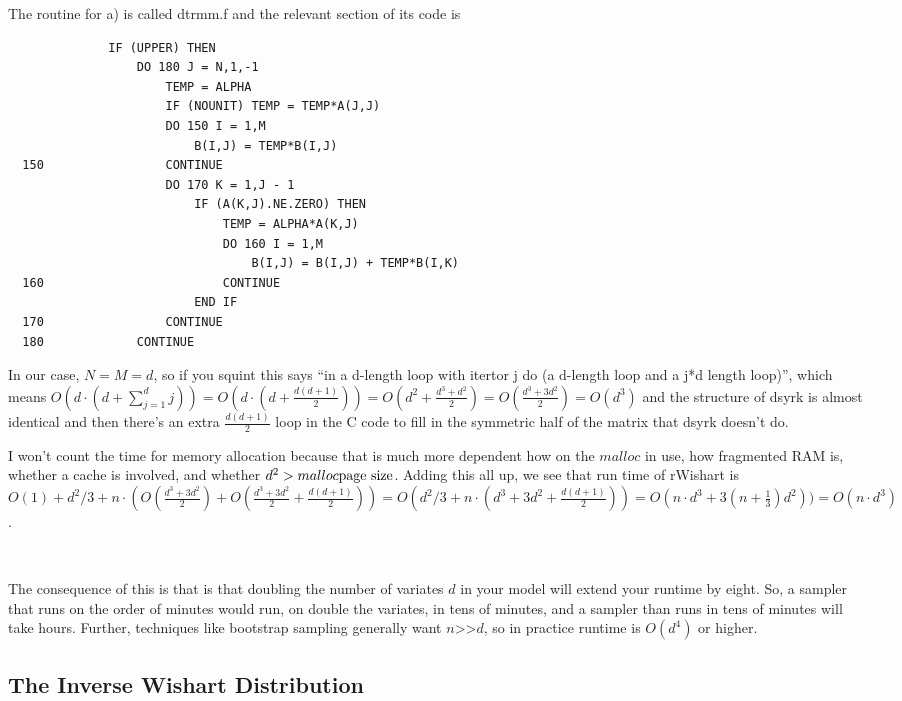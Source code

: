 \documentclass[english]{article}
\begin{document}
The routine for a) is called dtrmm.f and the relevant section of its
code is

\begin{lstlisting}
              IF (UPPER) THEN
                  DO 180 J = N,1,-1
                      TEMP = ALPHA
                      IF (NOUNIT) TEMP = TEMP*A(J,J)
                      DO 150 I = 1,M
                          B(I,J) = TEMP*B(I,J)
  150                 CONTINUE
                      DO 170 K = 1,J - 1
                          IF (A(K,J).NE.ZERO) THEN
                              TEMP = ALPHA*A(K,J)
                              DO 160 I = 1,M
                                  B(I,J) = B(I,J) + TEMP*B(I,K)
  160                         CONTINUE
                          END IF
  170                 CONTINUE
  180             CONTINUE
\end{lstlisting}


In our case, $N=M=d$, so if you squint this says ``in a d-length
loop with itertor j do (a d-length loop and a j{*}d length loop)'',
which means $O(d\cdot(d+\sum_{j=1}^{d}j))=O(d\cdot(d+\frac{d(d+1)}{2}))=O(d^{2}+\frac{d^{3}+d^{2}}{2})=O(\frac{d^{3}+3d^{2}}{2})=O(d^{3})$
and the structure of dsyrk is almost identical  and then there's
an extra $\frac{d(d+1)}{2}$ loop in the C code to fill in the symmetric
half of the matrix that dsyrk doesn't do.

I won't count the time for memory allocation because that is much
more dependent how on the $malloc$ in use, how fragmented RAM is,
whether a cache is involved, and whether $d^{2}>\text{\ensuremath{malloc}page size}$.
Adding this all up, we see that run time of rWishart is $O(1)+d^{2}/3+n\cdot(O(\frac{d^{3}+3d^{2}}{2})+O(\frac{d^{3}+3d^{2}}{2}+\frac{d(d+1)}{2}))=O(d^{2}/3+n\cdot(d^{3}+3d^{2}+\frac{d(d+1)}{2}))=O(n\cdot d^{3}+3(n+\frac{1}{3})d^{2}))=O(n\cdot d^{3})$.

~

The consequence of this is that is that doubling the number of variates
$d$ in your model will extend your runtime by eight. So, a sampler
that runs on the order of minutes would run, on double the variates,
in tens of minutes, and a sampler than runs in tens of minutes will
take hours. Further, techniques like bootstrap sampling generally
want $n$>\textcompwordmark{}>$d$, so in practice runtime is $O(d^{4})$
or higher. 




\subsection*{The Inverse Wishart Distribution}
\end{document}
